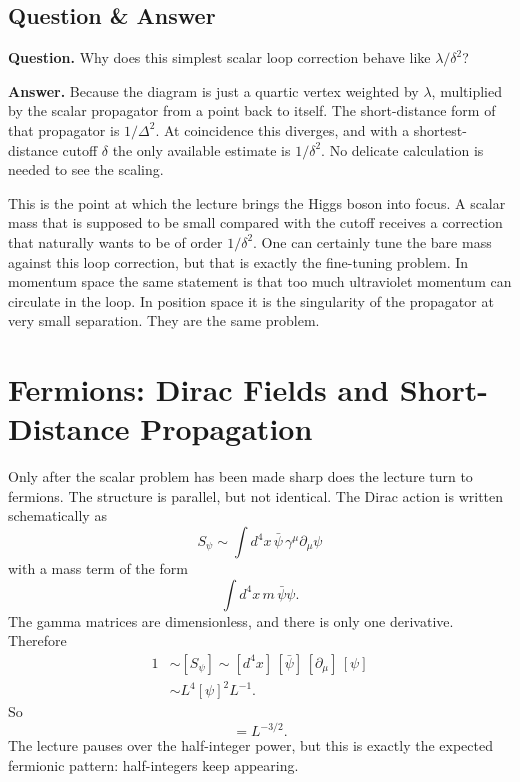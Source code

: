 \subsection{Question \& Answer}

\textbf{Question.} Why does this simplest scalar loop correction behave like \(\lambda/\delta^2\)?

\textbf{Answer.} Because the diagram is just a quartic vertex weighted by \(\lambda\), multiplied by the scalar propagator from a point back to itself. The short-distance form of that propagator is \(1/\Delta^2\). At coincidence this diverges, and with a shortest-distance cutoff \(\delta\) the only available estimate is \(1/\delta^2\). No delicate calculation is needed to see the scaling.

This is the point at which the lecture brings the Higgs boson into focus. A scalar mass that is supposed to be small compared with the cutoff receives a correction that naturally wants to be of order \(1/\delta^2\). One can certainly tune the bare mass against this loop correction, but that is exactly the fine-tuning problem. In momentum space the same statement is that too much ultraviolet momentum can circulate in the loop. In position space it is the singularity of the propagator at very small separation. They are the same problem.

\section{Fermions: Dirac Fields and Short-Distance Propagation}

Only after the scalar problem has been made sharp does the lecture turn to fermions. The structure is parallel, but not identical. The Dirac action is written schematically as
\begin{equation}
S_\psi \sim \int d^4x\, \bar\psi\,\gamma^\mu \partial_\mu \psi
\end{equation}
with a mass term of the form
\begin{equation}
\int d^4x\, m\,\bar\psi\psi.
\end{equation}
The gamma matrices are dimensionless, and there is only one derivative. Therefore
\begin{align}
1 &\sim [S_\psi]
   \sim [d^4x]\,[\bar\psi]\,[\partial_\mu]\,[\psi] \\
  &\sim L^4 [\psi]^2 L^{-1}.
\end{align}
So
\begin{equation}
[\psi] = L^{-3/2}.
\end{equation}
The lecture pauses over the half-integer power, but this is exactly the expected fermionic pattern: half-integers keep appearing.

